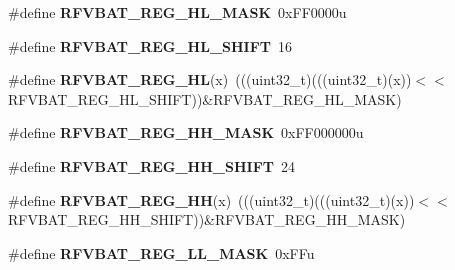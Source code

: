 \begin{DoxyCompactItemize}
\item 
\#define {\bfseries R\+F\+V\+B\+A\+T\+\_\+\+R\+E\+G\+\_\+\+H\+L\+\_\+\+M\+A\+SK}~0x\+F\+F0000u\hypertarget{group__RFVBAT__Register__Masks_gae0f69a55f5feaf1e41b317aaa17780fe}{}\label{group__RFVBAT__Register__Masks_gae0f69a55f5feaf1e41b317aaa17780fe}

\item 
\#define {\bfseries R\+F\+V\+B\+A\+T\+\_\+\+R\+E\+G\+\_\+\+H\+L\+\_\+\+S\+H\+I\+FT}~16\hypertarget{group__RFVBAT__Register__Masks_ga069a18ff685d5c1e8e48acc77454bf70}{}\label{group__RFVBAT__Register__Masks_ga069a18ff685d5c1e8e48acc77454bf70}

\item 
\#define {\bfseries R\+F\+V\+B\+A\+T\+\_\+\+R\+E\+G\+\_\+\+HL}(x)~(((uint32\+\_\+t)(((uint32\+\_\+t)(x))$<$$<$R\+F\+V\+B\+A\+T\+\_\+\+R\+E\+G\+\_\+\+H\+L\+\_\+\+S\+H\+I\+FT))\&R\+F\+V\+B\+A\+T\+\_\+\+R\+E\+G\+\_\+\+H\+L\+\_\+\+M\+A\+SK)\hypertarget{group__RFVBAT__Register__Masks_gade785dbcefc44dd4be0a7a423e05affb}{}\label{group__RFVBAT__Register__Masks_gade785dbcefc44dd4be0a7a423e05affb}

\item 
\#define {\bfseries R\+F\+V\+B\+A\+T\+\_\+\+R\+E\+G\+\_\+\+H\+H\+\_\+\+M\+A\+SK}~0x\+F\+F000000u\hypertarget{group__RFVBAT__Register__Masks_gad2932f13b6d26fa7ccb982b9cffcd184}{}\label{group__RFVBAT__Register__Masks_gad2932f13b6d26fa7ccb982b9cffcd184}

\item 
\#define {\bfseries R\+F\+V\+B\+A\+T\+\_\+\+R\+E\+G\+\_\+\+H\+H\+\_\+\+S\+H\+I\+FT}~24\hypertarget{group__RFVBAT__Register__Masks_gae67376345507e381e7f56f8bae49359c}{}\label{group__RFVBAT__Register__Masks_gae67376345507e381e7f56f8bae49359c}

\item 
\#define {\bfseries R\+F\+V\+B\+A\+T\+\_\+\+R\+E\+G\+\_\+\+HH}(x)~(((uint32\+\_\+t)(((uint32\+\_\+t)(x))$<$$<$R\+F\+V\+B\+A\+T\+\_\+\+R\+E\+G\+\_\+\+H\+H\+\_\+\+S\+H\+I\+FT))\&R\+F\+V\+B\+A\+T\+\_\+\+R\+E\+G\+\_\+\+H\+H\+\_\+\+M\+A\+SK)\hypertarget{group__RFVBAT__Register__Masks_gad544c6138476e4e13e072614ac354d2c}{}\label{group__RFVBAT__Register__Masks_gad544c6138476e4e13e072614ac354d2c}

\item 
\#define {\bfseries R\+F\+V\+B\+A\+T\+\_\+\+R\+E\+G\+\_\+\+L\+L\+\_\+\+M\+A\+SK}~0x\+F\+Fu\hypertarget{group__RFVBAT__Register__Masks_gac055aaeebf0ff5200e7b3703d6a6ed73}{}\label{group__RFVBAT__Register__Masks_gac055aaeebf0ff5200e7b3703d6a6ed73}


\end{DoxyCompactItemize}
